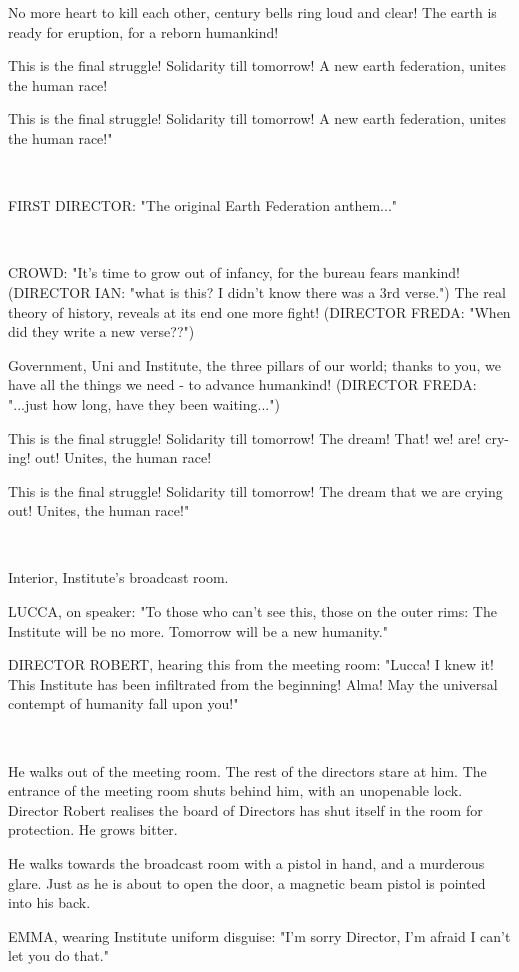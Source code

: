 \documentclass[11pt]{article}
\begin{document}
No more heart to kill each other,
century bells ring loud and clear!
The earth is ready for eruption,
for a reborn humankind!

This is the final struggle! 
Solidarity till tomorrow!
A new earth federation,
unites the human race! 

This is the final struggle!
Solidarity till tomorrow!
A new earth federation,
unites the human race!"

\ 

FIRST DIRECTOR: "The original Earth Federation anthem..."

\ 

CROWD: "It's time to grow out of infancy,
for the bureau fears mankind! (DIRECTOR IAN: "what is this? I didn't know there was a 3rd verse.")
The real theory of history, 
reveals at its end one more fight! (DIRECTOR FREDA: "When did they write a new verse??")

Government, Uni and Institute, 
the three pillars of our world;
thanks to you, we have all the things we need - 
to advance humankind! (DIRECTOR FREDA: "...just how long, have they been waiting...")

This is the final struggle!
Solidarity till tomorrow!
The dream! That! we! are! cry-ing! out!
Unites, the human race!

This is the final struggle!
Solidarity till tomorrow!
The dream that we are crying out!
Unites, the human race!"

\ 

Interior, Institute's broadcast room.

LUCCA, on speaker: "To those who can't see this, those on the outer rims: 
The Institute will be no more.
Tomorrow will be a new humanity."

DIRECTOR ROBERT, hearing this from the meeting room: "Lucca! 
I knew it! This Institute has been infiltrated from the beginning!
Alma! 
May the universal contempt of humanity fall upon you!"

\ 

He walks out of the meeting room. 
The rest of the directors stare at him.
The entrance of the meeting room shuts behind him, with an unopenable lock. 
Director Robert realises the board of Directors has shut itself in the room for protection. He grows bitter.

He walks towards the broadcast room with a pistol in hand, and a murderous glare. 
Just as he is about to open the door, a magnetic beam pistol is pointed into his back.

EMMA, wearing Institute uniform disguise: "I'm sorry Director, I'm afraid I can't let you do that."
\end{document}
